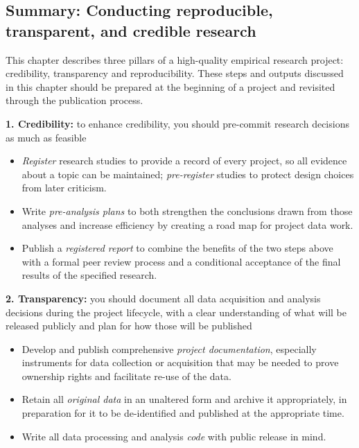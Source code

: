 \documentclass[
]{book}
\providecommand{\tightlist}{%
  \setlength{\itemsep}{0pt}\setlength{\parskip}{0pt}}
\begin{document}
\begin{summary}
\hypertarget{summary-conducting-reproducible-transparent-and-credible-research}{%
\subsection*{Summary: Conducting reproducible, transparent, and credible research}\label{summary-conducting-reproducible-transparent-and-credible-research}}

This chapter describes three pillars of a high-quality empirical research project: credibility, transparency and reproducibility. These steps and outputs discussed in this chapter should be prepared at the beginning of a project and revisited through the publication process.

\textbf{1. Credibility:} to enhance credibility, you should pre-commit research decisions as much as feasible

\begin{itemize}
\tightlist
\item
  \emph{Register} research studies to provide a record of every project, so all evidence about a topic can be maintained; \emph{pre-register} studies to protect design choices from later criticism.
\item
  Write \emph{pre-analysis plans} to both strengthen the conclusions drawn from those analyses and increase efficiency by creating a road map for project data work.
\item
  Publish a \emph{registered report} to combine the benefits of the two steps above with a formal peer review process and a conditional acceptance of the final results of the specified research.
\end{itemize}

\textbf{2. Transparency:} you should document all data acquisition and analysis decisions during the project lifecycle, with a clear understanding of what will be released publicly and plan for how those will be published

\begin{itemize}
\tightlist
\item
  Develop and publish comprehensive \emph{project documentation}, especially instruments for data collection or acquisition that may be needed to prove ownership rights and facilitate re-use of the data.
\item
  Retain all \emph{original data} in an unaltered form and archive it appropriately, in preparation for it to be de-identified and published at the appropriate time.
\item
  Write all data processing and analysis \emph{code} with public release in mind.
\end{itemize}


\end{summary}
\end{document}
